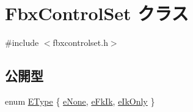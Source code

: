 \hypertarget{class_fbx_control_set}{}\section{Fbx\+Control\+Set クラス}
\label{class_fbx_control_set}


{\ttfamily \#include $<$fbxcontrolset.\+h$>$}

\subsection*{公開型}
\begin{DoxyCompactItemize}
\item 
enum \hyperlink{class_fbx_control_set_a13a51702c46fff33d50c05d20f3d9f04}{E\+Type} \{ \hyperlink{class_fbx_control_set_a13a51702c46fff33d50c05d20f3d9f04a46051fef1ba3959493a85b648ad79fb3}{e\+None}, 
\hyperlink{class_fbx_control_set_a13a51702c46fff33d50c05d20f3d9f04aa9d5c5029cb36d24823a4b149b9abaf7}{e\+Fk\+Ik}, 
\hyperlink{class_fbx_control_set_a13a51702c46fff33d50c05d20f3d9f04aaaaceee39734f8a013967e7703d3b120}{e\+Ik\+Only}
 \}
\end{DoxyCompactItemize}
